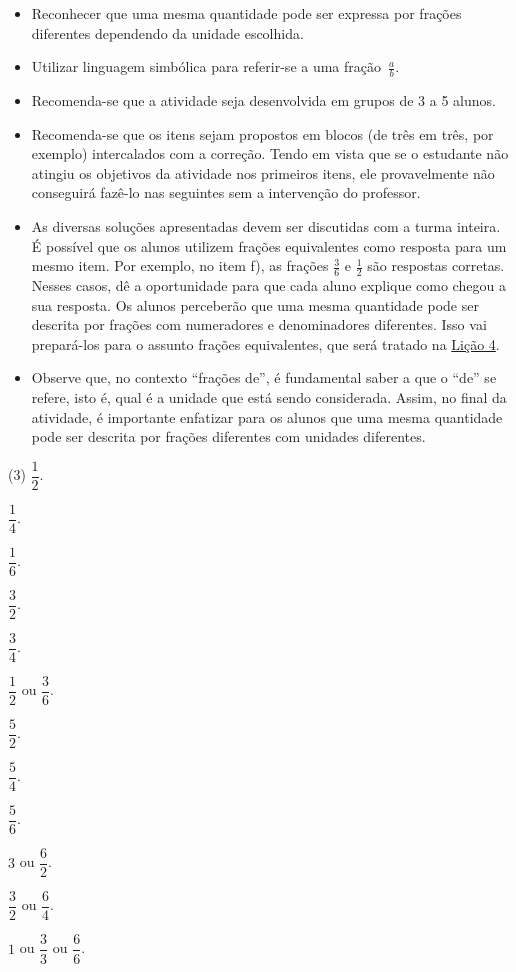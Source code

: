 \begin{atividade}\label{chap2-ativ15}
\objetivos
\begin{itemize} %
    \item Reconhecer que uma mesma quantidade pode ser expressa por frações diferentes dependendo da unidade escolhida.
    \item Utilizar linguagem simbólica para referir-se a uma fração~$\frac{a}{b}$.
\end{itemize} %

\discussoes
  \begin{itemize} %
  \item Recomenda-se que a atividade seja desenvolvida em grupos de 3 a 5 alunos.
    \item Recomenda-se que os itens sejam propostos em blocos (de três em três, por exemplo) intercalados com a correção. Tendo em vista que se o estudante não atingiu os objetivos da atividade nos primeiros itens, ele provavelmente não conseguirá fazê-lo nas seguintes sem a intervenção do professor.
    \item As diversas soluções apresentadas devem ser discutidas com a
turma inteira. É possível que os alunos utilizem frações equivalentes como
resposta para um mesmo item. Por exemplo, no item f), as frações $\frac{3}{6}$ e $\frac{1}{2}$ são respostas corretas. Nesses casos, dê a oportunidade para que cada aluno explique como chegou a sua resposta. Os alunos perceberão que uma mesma quantidade pode ser descrita por frações com numeradores e denominadores diferentes. Isso vai prepará-los para o assunto frações equivalentes, que será tratado na \hyperref[chap4]{Lição 4}.
    \item Observe que, no contexto ``frações de'', é fundamental saber a que o ``de'' se refere, isto é, qual é a unidade que está sendo considerada. Assim, no final da atividade, é importante enfatizar para os alunos que uma mesma quantidade pode ser descrita por frações diferentes com unidades diferentes.
\end{itemize} %

\solucao

\begin{tasks}(3)
\task $\dfrac{1}{2}$.

\task $\dfrac{1}{4}$.

\task $\dfrac{1}{6}$.

\task $\dfrac{3}{2}$.

\task $\dfrac{3}{4}$.

\task $\dfrac{1}{2}$ ou $\dfrac{3}{6}$.

\task $\dfrac{5}{2}$.

\task $\dfrac{5}{4}$.

\task $\dfrac{5}{6}$.

\task $3$ ou $\dfrac{6}{2}$.

\task $\dfrac{3}{2}$ ou $\dfrac{6}{4}$.

\setcounter{task}{12}

\task $1$ ou $\dfrac{3}{3}$  ou $\dfrac{6}{6}$.

\end{tasks}
\end{atividade}

